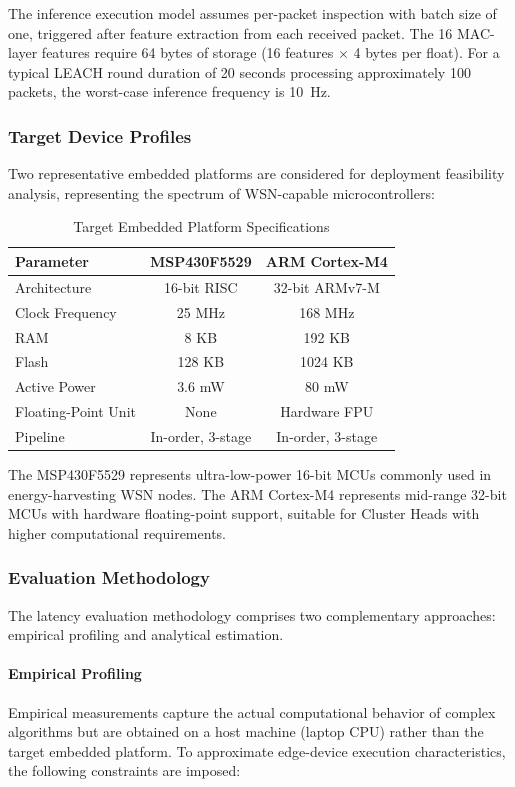 The inference execution model assumes per-packet inspection with batch size of one, triggered after feature extraction from each received packet. The 16 MAC-layer features require 64 bytes of storage (16 features $\times$ 4 bytes per float). For a typical LEACH round duration of 20 seconds processing approximately 100 packets, the worst-case inference frequency is 10~Hz.

\subsubsection{Target Device Profiles}

Two representative embedded platforms are considered for deployment feasibility analysis, representing the spectrum of WSN-capable microcontrollers:

\begin{table}[htbp]
\centering
\caption{Target Embedded Platform Specifications}
\label{tab:device_profiles}
\begin{tabular}{lcc}
\hline
\textbf{Parameter} & \textbf{MSP430F5529} & \textbf{ARM Cortex-M4} \\
\hline
Architecture & 16-bit RISC & 32-bit ARMv7-M \\
Clock Frequency & 25 MHz & 168 MHz \\
RAM & 8 KB & 192 KB \\
Flash & 128 KB & 1024 KB \\
Active Power & 3.6 mW & 80 mW \\
Floating-Point Unit & None & Hardware FPU \\
Pipeline & In-order, 3-stage & In-order, 3-stage \\
\hline
\end{tabular}
\end{table}

The MSP430F5529 represents ultra-low-power 16-bit MCUs commonly used in energy-harvesting WSN nodes. The ARM Cortex-M4 represents mid-range 32-bit MCUs with hardware floating-point support, suitable for Cluster Heads with higher computational requirements.

\subsubsection{Evaluation Methodology}

The latency evaluation methodology comprises two complementary approaches: empirical profiling and analytical estimation.

\paragraph{Empirical Profiling} Empirical measurements capture the actual computational behavior of complex algorithms but are obtained on a host machine (laptop CPU) rather than the target embedded platform. To approximate edge-device execution characteristics, the following constraints are imposed:

